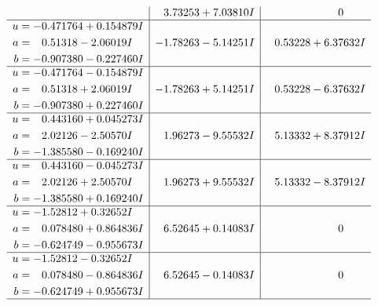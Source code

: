 \documentclass[1p]{elsarticle_modified}
\theoremstyle{definition}
\begin{document}
$$\begin{array}{c|c|c}
 & \phantom{-}3.73253 + 7.03810 I & \phantom{-0.000000 } 0 \\ \hline\begin{aligned}
u &= -0.471764 + 0.154879 I \\
a &= \phantom{-}0.51318 - 2.06019 I \\
b &= -0.907380 - 0.227460 I\end{aligned}
 & -1.78263 - 5.14251 I & \phantom{-}0.53228 + 6.37632 I \\ \hline\begin{aligned}
u &= -0.471764 - 0.154879 I \\
a &= \phantom{-}0.51318 + 2.06019 I \\
b &= -0.907380 + 0.227460 I\end{aligned}
 & -1.78263 + 5.14251 I & \phantom{-}0.53228 - 6.37632 I \\ \hline\begin{aligned}
u &= \phantom{-}0.443160 + 0.045273 I \\
a &= \phantom{-}2.02126 - 2.50570 I \\
b &= -1.385580 - 0.169240 I\end{aligned}
 & \phantom{-}1.96273 - 9.55532 I & \phantom{-}5.13332 + 8.37912 I \\ \hline\begin{aligned}
u &= \phantom{-}0.443160 - 0.045273 I \\
a &= \phantom{-}2.02126 + 2.50570 I \\
b &= -1.385580 + 0.169240 I\end{aligned}
 & \phantom{-}1.96273 + 9.55532 I & \phantom{-}5.13332 - 8.37912 I \\ \hline\begin{aligned}
u &= -1.52812 + 0.32652 I \\
a &= \phantom{-}0.078480 + 0.864836 I \\
b &= -0.624749 - 0.955673 I\end{aligned}
 & \phantom{-}6.52645 + 0.14083 I & \phantom{-0.000000 } 0 \\ \hline\begin{aligned}
u &= -1.52812 - 0.32652 I \\
a &= \phantom{-}0.078480 - 0.864836 I \\
b &= -0.624749 + 0.955673 I\end{aligned}
 & \phantom{-}6.52645 - 0.14083 I & \phantom{-0.000000 } 0\\
 \hline 
 \end{array}$$\newpage
\newpage\renewcommand{\arraystretch}{1}
\end{document}
